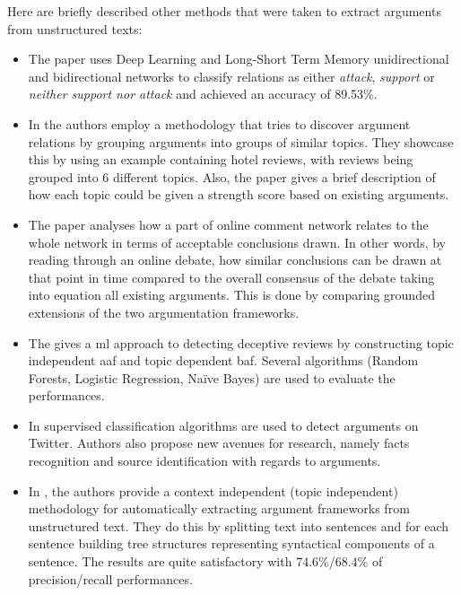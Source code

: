         Here are briefly described other methods that were taken to extract arguments from unstructured texts:
        \begin{itemize}
            \item The \autocite{Cocarascu2017IdentifyingAA} paper uses Deep Learning and Long-Short Term Memory unidirectional and bidirectional networks to classify relations as either \textit{attack}, \textit{support} or \textit{neither support nor attack} and achieved an accuracy of 89.53\%. 
            
            \item In \autocite{Cocarascu2017MiningBA} the authors employ a methodology that tries to discover argument relations by grouping arguments into groups of similar topics. They showcase this by using an example containing hotel reviews, with reviews being grouped into 6 different topics. Also, the paper gives a brief description of how each topic could be given a strength score based on existing arguments.
            
            \item The \autocite{ApproxToTruth} paper analyses how a part of online comment network relates to the whole network in terms of acceptable conclusions drawn. In other words, by reading through an online debate, how similar conclusions can be drawn at that point in time compared to the overall consensus of the debate taking into equation all existing arguments. This is done by comparing grounded extensions of the two argumentation frameworks.
            
            \item The \autocite{Cocarascu2016DetectingDR} gives a \gls{ml} approach to detecting deceptive reviews by constructing topic independent \gls{aaf} and topic dependent \gls{baf}. Several algorithms (Random Forests, Logistic Regression, Na{\"i}ve Bayes) are used to evaluate the performances.
            
            \item In \autocite{Dusmanu2017ArgumentMO} supervised classification algorithms are used to detect arguments on Twitter. Authors also propose new avenues for research, namely facts recognition and source identification with regards to arguments.
            
            \item In \autocite{Lippi2015ContextIndependentCD}, the authors provide a context independent (topic independent) methodology for automatically extracting argument frameworks from unstructured text. They do this by splitting text into sentences and for each sentence building tree structures representing syntactical components of a sentence. The results are quite satisfactory with 74.6\%/68.4\% of precision/recall performances.
        \end{itemize}